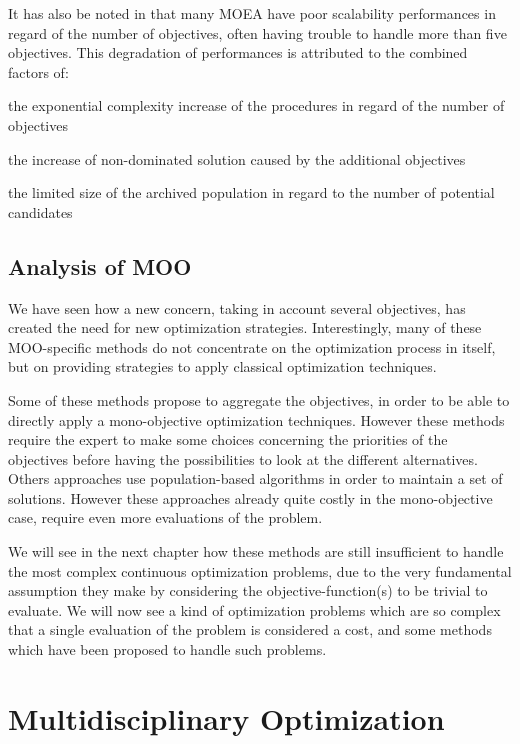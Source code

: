 It has also be noted in \cite{corne2007techniques} that many MOEA have poor scalability performances in regard of the number of objectives, often having trouble to handle more than five objectives. This degradation of performances is attributed to the combined factors of:
\begin{compactitem}
\item the exponential complexity increase of the procedures in regard of the number of objectives
\item the increase of non-dominated solution caused by the additional objectives
\item the limited size of the archived population in regard to the number of potential candidates
\end{compactitem}

\section{Analysis of MOO}

We have seen how a new concern, taking in account several objectives, has created the need for new optimization strategies. Interestingly, many of these MOO-specific methods do not concentrate on the optimization process in itself, but on providing strategies to apply classical optimization techniques.

Some of these methods propose to aggregate the objectives, in order to be able to directly apply a mono-objective optimization techniques. However these methods require the expert to make some choices concerning the priorities of the objectives before having the possibilities to look at the different alternatives.\\
Others approaches use population-based algorithms in order to maintain a set of solutions. However these approaches already quite costly in the mono-objective case, require even more evaluations of the problem.

We will see in the next chapter how these methods are still insufficient to handle the most complex continuous optimization problems, due to the very fundamental assumption they make by considering the objective-function(s) to be trivial to evaluate. We will now see a kind of optimization problems which are so complex that a single evaluation of the problem is considered a cost, and some methods which have been proposed to handle such problems.

\chapter{Multidisciplinary Optimization}\label{MDO_chapter}

